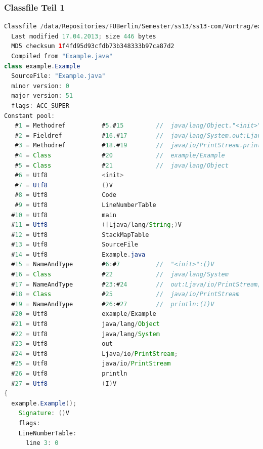 \documentclass[10pt]{beamer}
\begin{document}
\begin{frame}
\frametitle{Classfile Teil 1}
\begin{lstlisting}[language=Java,basicstyle=\ttfamily\tiny]
Classfile /data/Repositories/FUBerlin/Semester/ss13/ss13-com/Vortrag/example/Example.class
  Last modified 17.04.2013; size 446 bytes
  MD5 checksum 1f4fd95d93cfdb73b348333b97ca87d2
  Compiled from "Example.java"
class example.Example
  SourceFile: "Example.java"
  minor version: 0
  major version: 51
  flags: ACC_SUPER
Constant pool:
   #1 = Methodref          #5.#15         //  java/lang/Object."<init>":()V
   #2 = Fieldref           #16.#17        //  java/lang/System.out:Ljava/io/PrintStream;
   #3 = Methodref          #18.#19        //  java/io/PrintStream.println:(I)V
   #4 = Class              #20            //  example/Example
   #5 = Class              #21            //  java/lang/Object
   #6 = Utf8               <init>
   #7 = Utf8               ()V
   #8 = Utf8               Code
   #9 = Utf8               LineNumberTable
  #10 = Utf8               main
  #11 = Utf8               ([Ljava/lang/String;)V
  #12 = Utf8               StackMapTable
  #13 = Utf8               SourceFile
  #14 = Utf8               Example.java
  #15 = NameAndType        #6:#7          //  "<init>":()V
  #16 = Class              #22            //  java/lang/System
  #17 = NameAndType        #23:#24        //  out:Ljava/io/PrintStream;
  #18 = Class              #25            //  java/io/PrintStream
  #19 = NameAndType        #26:#27        //  println:(I)V
  #20 = Utf8               example/Example
  #21 = Utf8               java/lang/Object
  #22 = Utf8               java/lang/System
  #23 = Utf8               out
  #24 = Utf8               Ljava/io/PrintStream;
  #25 = Utf8               java/io/PrintStream
  #26 = Utf8               println
  #27 = Utf8               (I)V
{
  example.Example();
    Signature: ()V
    flags: 
    LineNumberTable:
      line 3: 0
\end{lstlisting}
\end{frame}
\end{document}
